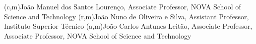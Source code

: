 %
%
%
%
(c,m){João Manuel dos Santos Lourenço, Associate Professor, NOVA School of Science and Technology}
(r,m){João Nuno de Oliveira e Silva, Assistant Professor, Instituto Superior Técnico}
(a,m){João Carlos Antunes Leitão, Associate Professor, Associate Professor, NOVA School of Science and Technology}

